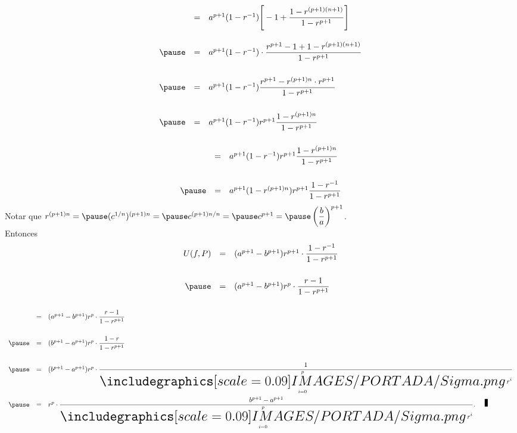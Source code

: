 \documentclass{beamer}
\begin{document}
\begin{frame}[t,fragile]
	\frametitle{\secname}
	\[
		\begin{array}{rcl}
			& = & a^ {p+1} (1-r^ {-1}) \Bigg[-1 + 
			\dfrac{1- r^ {(p+1) (n+1)}}{1-r^ {p+1}}\Bigg] \\[8mm]
			\pause
			& = & a^ {p+1} (1- r^ {-1}) \cdot 
			\dfrac{r^ {p+1} -1 + 1 - r^ {(p+1) (n+1)}}{1 -r^ {p+1}}\\[8mm]
			\pause
			& = & a^ {p+1} (1-r^ {-1}) 
			\dfrac{r^ {p+1} - r^ {(p+1) n} \cdot r^ {p+1}}{1- r^ {p+1}} \\[8mm]
			\pause
			& = & a^ {p+1} (1-r^ {-1}) r^ {p+1} 
			\dfrac{1 - r^ {(p+1) n}}{1-r^ {p+1}}
		\end{array}
	\]
\end{frame}

\begin{frame}[t,fragile]
	\frametitle{\secname}
	\[
		\begin{array}{rcl}
			& = & a^ {p+1} (1-r^ {-1}) r^ {p+1} 
			\dfrac{1 - r^ {(p+1) n}}{1-r^ {p+1}} \\[8mm] 
			\pause
			& = & a^ {p+1} (1-r^ {(p+1) n}) r^ {p+1} 
			\dfrac{1 - r^ {-1}}{1- r^ {p+1}}
		\end{array}
	\]
	\pause
	Notar que \(r^ {(p+1) n} = \pause
	(c^ {1/n})^ {(p+1) n} = \pause
	c^ {(p+1) n /n} = \pause
	c^ {p+1} = \pause
	\left(\dfrac{b}{a} \right)^ {p+1}\). \\ 
	\pause
	Entonces
	\[
		\begin{array}{rcl}
			U(f,P) & = & (a^ {p+1} - b^ {p+1}) r^ {p+1} \cdot 
			\dfrac{1 - r^ {-1}}{1- r^ {p+1}} \\[8mm]
			\pause
			& = &  (a^ {p+1} - b^ {p+1}) r^ {p} \cdot 
			\dfrac{r - 1}{1 - r^ {p+1}}
		\end{array}
	\]
\end{frame}

\begin{frame}[t,fragile]
	\frametitle{\secname}
	\[
		\begin{array}{rcl}
			& = &  (a^ {p+1} - b^ {p+1}) r^ {p} \cdot 
			\dfrac{r - 1}{1 - r^ {p+1}}\\[8mm]
			\pause
			& = & (b^ {p+1} - a^ {p+1}) r ^ p \cdot 
			\dfrac{1-r}{1-r^ {p+1}}\\[8mm]
			\pause
			& = & (b^ {p+1} - a^ {p+1}) r ^ p\cdot 
			\dfrac{1}{\dis\suma_{i=0}^{p} r ^ i} \\[1.2cm] 
			\pause
			& = & r ^ p \cdot 
			\dfrac{b^ {p+1} - a^ {p+1}}{\dis\suma_{i=0}^{p} r ^ i}. \qed
		\end{array}
	\]
\end{frame}
\end{document}
